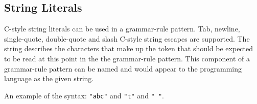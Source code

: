 
\subsection{String Literals}
{
	C-style string literals can be used in a grammar-rule pattern.
	Tab, newline, single-quote, double-quote and slash C-style string
	escapes are supported.
	The string describes the characters that make up the token that should be
	expected
	to be read at this point in the the grammar-rule pattern.
	This component of a grammar-rule pattern can be named and would appear to
	the programming language as the given string.
	
	An example of the syntax: \texttt{"abc"} and \texttt{"t"} and \texttt{" "}.
}

